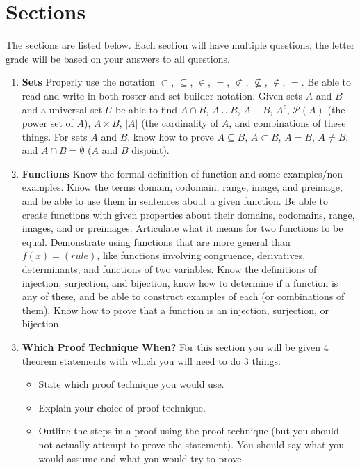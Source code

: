 \documentclass[12pt]{amsart}
\theoremstyle{definition}
\begin{document}
\section{Sections}

The sections are listed below. Each section will have multiple questions, the letter grade will be based on your answers to all questions.
\vfill

\begin{enumerate}
\item {\bf Sets}  Properly use the notation $\subset$, $\subseteq$, $\in$, $=$, $\not\subset$, $\not\subseteq$, $\notin$, $=$. Be able to read and write in both roster and set builder notation. Given sets $A$ and $B$ and a universal set $U$ be able to find $A\cap B$, $A\cup B$, $A-B$, $A^c$, $\mathcal{P}(A)$ (the power set of $A$), $A\times B$, $|A|$ (the cardinality of $A$, and combinations of these things. For sets $A$ and $B$, know how to prove $A\subseteq B$, $A\subset B$, $A=B$, $A\neq B$, and $A\cap B = \emptyset$ ($A$ and $B$ disjoint).
\vfill

\item {\bf Functions} Know the formal definition of function and some examples/non-examples. Know the terms domain, codomain, range, image, and preimage, and be able to use them in sentences about a given function. Be able to create functions with given properties about their domains, codomains, range, images, and or preimages. Articulate what it means for two functions to be equal. Demonstrate using functions that are more general than $f(x) = (rule)$, like functions involving congruence, derivatives, determinants, and functions of two variables. Know the definitions of injection, surjection, and bijection, know how to determine if a function is any of these, and be able to construct examples of each (or combinations of them). Know how to prove that a function is an injection, surjection, or bijection.


\vfill
\item {\bf Which Proof Technique When?}   For this section you will be given 4 theorem statements with which you will need to do 3 things:
	\begin{itemize}
	\item State which proof technique you would use.
	\item Explain your choice of proof technique.
	\item Outline the steps in a proof using the proof technique (but you should not actually attempt to prove the statement). You should say what you would assume and what you would try to prove. 
	 

\end{itemize}
\end{enumerate}
\end{document}
